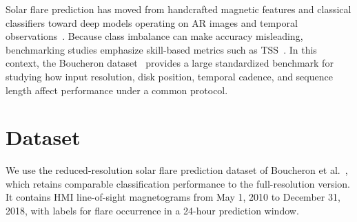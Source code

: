 \documentclass[runningheads]{llncs}
\begin{document}

Solar flare prediction has moved from handcrafted magnetic features and classical classifiers toward deep models operating on AR images and temporal observations~\cite{ref_li_flares,ref_shao_review}. Because class imbalance can make accuracy misleading, benchmarking studies emphasize skill-based metrics such as TSS~\cite{ref_bloomfield}. In this context, the Boucheron dataset~\cite{ref_boucheron} provides a large standardized benchmark for studying how input resolution, disk position, temporal cadence, and sequence length affect performance under a common protocol.


\section{Dataset}

We use the reduced-resolution solar flare prediction dataset of Boucheron et al.~\cite{ref_boucheron}, which retains comparable classification performance to the full-resolution version. It contains HMI line-of-sight magnetograms from May 1, 2010 to December 31, 2018, with labels for flare occurrence in a 24-hour prediction window.
\end{document}
